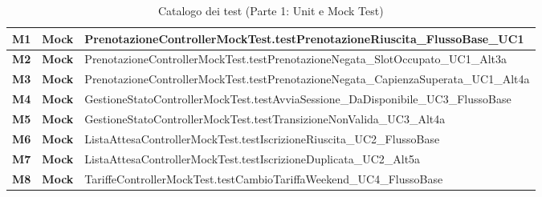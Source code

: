 \begin{table}[htbp]
\begin{tabularx}{\textwidth}{|>{\bfseries}l|>{\bfseries}l|>{\raggedright\arraybackslash}X|}
        M1 & Mock & {\ttfamily\footnotesize PrenotazioneControllerMockTest.\newline testPrenotazioneRiuscita\_FlussoBase\_UC1} \\ \hline
        M2 & Mock & {\ttfamily\footnotesize PrenotazioneControllerMockTest.\newline testPrenotazioneNegata\_SlotOccupato\_UC1\_Alt3a} \\ \hline
        M3 & Mock & {\ttfamily\footnotesize PrenotazioneControllerMockTest.\newline testPrenotazioneNegata\_CapienzaSuperata\_UC1\_Alt4a} \\ \hline
        M4 & Mock & {\ttfamily\footnotesize GestioneStatoControllerMockTest.\newline testAvviaSessione\_DaDisponibile\_UC3\_FlussoBase} \\ \hline
        M5 & Mock & {\ttfamily\footnotesize GestioneStatoControllerMockTest.\newline testTransizioneNonValida\_UC3\_Alt4a} \\ \hline
        M6 & Mock & {\ttfamily\footnotesize ListaAttesaControllerMockTest.\newline testIscrizioneRiuscita\_UC2\_FlussoBase} \\ \hline
        M7 & Mock & {\ttfamily\footnotesize ListaAttesaControllerMockTest.\newline testIscrizioneDuplicata\_UC2\_Alt5a} \\ \hline
        M8 & Mock & {\ttfamily\footnotesize TariffeControllerMockTest.\newline testCambioTariffaWeekend\_UC4\_FlussoBase} \\ \hline
    \end{tabularx}
    \caption{Catalogo dei test (Parte 1: Unit e Mock Test)}
    \label{tab:test_catalog_1}
\end{table}

